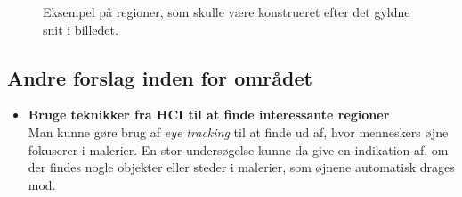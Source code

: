 {\begin{figure}[!h]
    \centering
    \caption[]{Eksempel på regioner, som skulle være
    konstrueret efter det gyldne snit i billedet.}
    \label{monalisa_fake}
\end{figure}


\subsection{Andre forslag inden for området}
\begin{itemize}
    \item \textbf{Bruge teknikker fra HCI til at finde interessante regioner}\\
        Man kunne gøre brug af \emph{eye tracking} til at finde ud af,
        hvor menneskers øjne fokuserer i malerier. En stor undersøgelse
        kunne da give en indikation af, om der findes nogle objekter
        eller steder i malerier, som øjnene automatisk drages mod.
\end{itemize}

}


